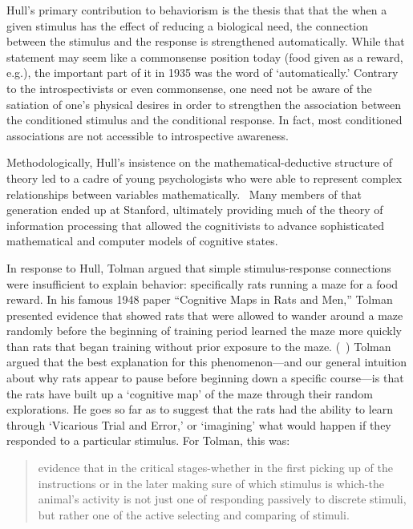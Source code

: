 \begin{refsection}
Hull's primary contribution to behaviorism is the thesis that that the when a given stimulus has the effect of reducing a biological need, the connection between the stimulus and the response is strengthened automatically. While that statement may seem like a commonsense position today (food given as a reward, e.g.), the important part of it in 1935 was the word of `automatically.' Contrary to the introspectivists or even commonsense, one need not be aware of the satiation of one's physical desires in order to strengthen the association between the conditioned stimulus and the conditional response. In fact, most conditioned associations are not accessible to introspective awareness.

Methodologically, Hull's insistence on the mathematical-deductive structure of theory led to a cadre of young psychologists who were able to represent complex relationships between variables mathematically.~\citep{Hull:1940tm} Many members of that generation ended up at Stanford, ultimately providing much of the theory of information processing that allowed the cognitivists to advance sophisticated mathematical and computer models of cognitive states.

In response to Hull, Tolman argued that simple stimulus-response connections were insufficient to explain behavior: specifically rats running a maze for a food reward. In his famous 1948 paper ``Cognitive Maps in Rats and Men,'' Tolman presented evidence that showed rats that were allowed to wander around a maze randomly before the beginning of training period learned the maze more quickly than rats that began training without prior exposure to the maze. (~\citep{Tolman:1948kv}) Tolman argued that the best explanation for this phenomenon---and our general intuition about why rats appear to pause before beginning down a specific course---is that the rats have built up a `cognitive map' of the maze through their random explorations. He goes so far as to suggest that the rats had the ability to learn through `Vicarious Trial and Error,' or `imagining' what would happen if they responded to a particular stimulus. For Tolman, this was:

\begin{quote}

evidence that in the critical stages-whether in the first picking up of the instructions or in the later making sure of which stimulus is which-the animal's activity is not just one of responding passively to discrete stimuli, but rather one of the active selecting and comparing of stimuli. ~\citep[p. 200]{Tolman:1948ty}
\end{quote}


\end{refsection}
